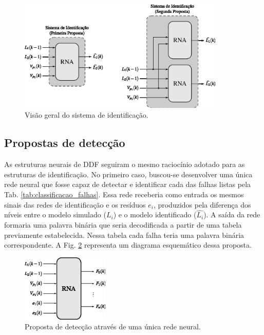 \begin{figure}[!htb]
\centering
    \includegraphics[width=0.875\textwidth]{imgs/sistema/eps/sist_ident}
    \caption{Visão geral do sistema de identificação.}
    \label{fig:sist_ident}
\end{figure}

\subsection{Propostas de detecção}
As estruturas neurais de DDF seguiram o mesmo raciocínio adotado para as
estruturas de identificação. No primeiro caso, buscou-se desenvolver uma única
rede neural que fosse capaz de detectar e identificar cada das falhas listas
pela Tab. \ref{tab:classificacao_falhas}. Essa rede receberia como entrada os
mesmos sinais das redes de identificação e os resíduos $e_i$, produzidos pela
diferença dos níveis entre o modelo simulado ($L_i$) e o modelo identificado
($\widehat{L_i}$). A saída da rede formaria uma palavra binária que seria
decodificada a partir de uma tabela previamente estabelecida. Nessa tabela cada
falha teria uma palavra binária correspondente.  A Fig. \ref{fig:detec_prop_1}
representa um diagrama esquemático dessa proposta.

\begin{figure}[!htb]
\centering
    \includegraphics[width=0.37\textwidth]{imgs/sistema/eps/detec_prop_1}
    \caption{Proposta de detecção através de uma única rede neural.}
    \label{fig:detec_prop_1}
\end{figure}

